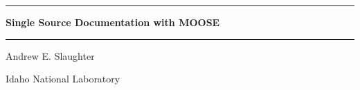 \documentclass[]{report}
\begin{document}
\begin{titlepage}
  \begin{center}
    \rule{\linewidth}{2pt}\par
    \bigskip
        {\huge \textbf{Single Source Documentation with MOOSE}}
    \smallskip
    \rule{\linewidth}{1pt}\par
    
    
    \vfill
    Andrew E. Slaughter\par
    
    \vfill
    
    Idaho National Laboratory\par
    \medskip
    
    
    \end{center}
\end{titlepage}


\tableofcontents\newpage
\end{document}
